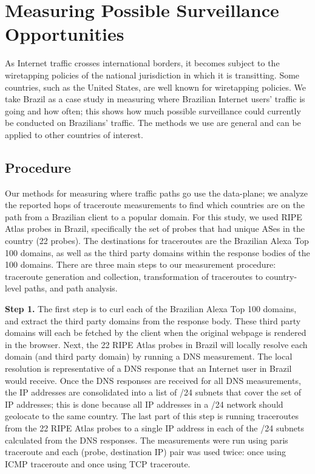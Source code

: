 \section{Measuring Possible Surveillance Opportunities}
\label{measure}

As Internet traffic crosses international borders, it becomes subject to the wiretapping policies of the national jurisdiction in which it is transitting.  Some countries, such as the United States, are well known for wiretapping policies.  We take Brazil as a case study in measuring where Brazilian Internet users' traffic is going and how often; this shows how much possible surveillance could currently be conducted on Brazilians' traffic.  The methods we use are general and can be applied to other countries of interest.

\subsection{Procedure}
Our methods for measuring where traffic paths go use the data-plane; we analyze the reported hops of traceroute measurements to find which countries are on the path from a Brazilian client to a popular domain.  For this study, we used RIPE Atlas probes in Brazil, specifically the set of probes that had unique ASes in the country (22 probes).  The destinations for traceroutes are the Brazilian Alexa Top 100 domains, as well as the third party domains within the response bodies of the 100 domains.  There are three main steps to our measurement procedure: traceroute generation and collection, transformation of traceroutes to country-level paths, and path analysis.

{\bf Step 1.} The first step is to curl each of the Brazilian Alexa Top 100 domains, and extract the third party domains from the response body.  These third party domains will each be fetched by the client when the original webpage is rendered in the browser.  Next, the 22 RIPE Atlas probes in Brazil will locally resolve each domain (and third party domain) by running a DNS measurement.  The local resolution is representative of a DNS response that an Internet user in Brazil would receive.  Once the DNS responses are received for all DNS measurements, the IP addresses are consolidated into a list of /24 subnets that cover the set of IP addresses; this is done because all IP addresses in a /24 network should geolocate to the same country.  The last part of this step is running traceroutes from the 22 RIPE Atlas probes to a single IP address in each of the /24 subnets calculated from the DNS responses.  The measurements were run using paris traceroute and each (probe, destination IP) pair was used twice: once using ICMP traceroute and once using TCP traceroute.  

